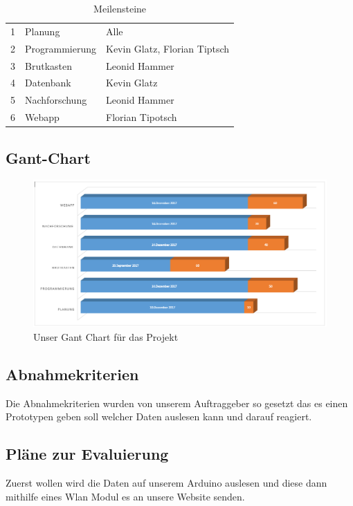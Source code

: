 \begin{table}[H]
	\caption{Meilensteine}
	\label{meilensteine}
	\begin{tabular}{lll}
		1   & Planung                      & Alle                         \\
		2   & Programmierung & Kevin Glatz, Florian Tiptsch \\
		3   & Brutkasten             & Leonid Hammer                \\
		4   & Datenbank                    & Kevin Glatz                  \\
		5   & Nachforschung           & Leonid Hammer                \\
		6   & Webapp                       & Florian Tipotsch            
	\end{tabular}
\end{table}

\subsection{Gant-Chart}
  
\begin{figure} 
\hspace*{-2cm}
\includegraphics[width=530pt]{figures/Gant}
\caption{Unser Gant Chart für das Projekt} 
\end{figure}
\subsection{Abnahmekriterien}
Die Abnahmekriterien wurden von unserem Auftraggeber so gesetzt das es einen Prototypen geben soll welcher Daten auslesen kann und darauf reagiert.
\subsection{Pläne zur Evaluierung}
Zuerst wollen wird die Daten auf unserem Arduino auslesen und diese dann mithilfe eines Wlan Modul es an unsere Website senden.


